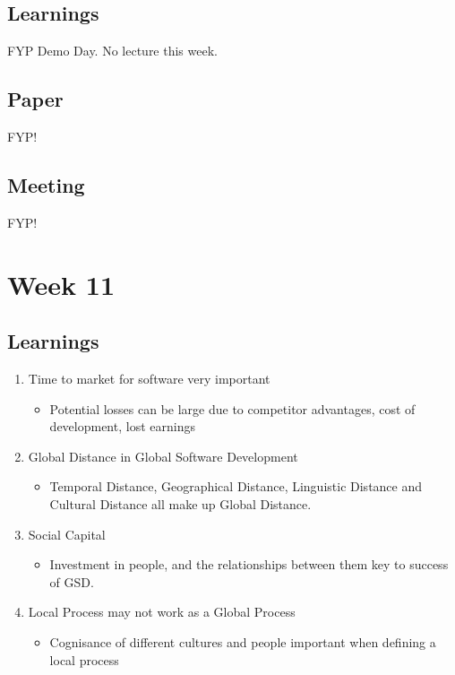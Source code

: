 \section{Learnings}

FYP Demo Day. No lecture this week.

\section{Paper}

FYP!

\section{Meeting}

FYP!

\chapter{Week 11}

\section{Learnings}
\begin{enumerate}
\item Time to market for software very important
\begin{itemize}
\item Potential losses can be large due to competitor advantages, cost of development, lost earnings
\end{itemize}
\item Global Distance in Global Software Development
\begin{itemize}
\item Temporal Distance, Geographical Distance, Linguistic Distance and Cultural Distance all make up Global Distance. 
\end{itemize}
\item Social Capital
\begin{itemize}
\item Investment in people, and the relationships between them key to success of GSD. 
\end{itemize}
\item Local Process may not work as a Global Process
\begin{itemize}
\item Cognisance of different cultures and people important when defining a local process
\end{itemize}
\end{enumerate}


